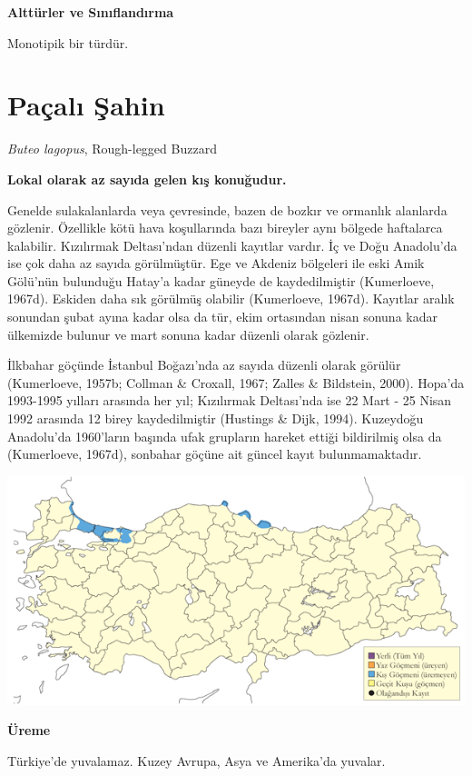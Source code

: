 \documentclass[
  a4paper,
  DIV=11,
  numbers=noendperiod]{scrreprt}
\begin{document}
\textbf{Alttürler ve Sınıflandırma}

Monotipik bir türdür.

\section{Paçalı Şahin}\label{pauxe7alux131-ux15fahin}

\emph{Buteo lagopus}, Rough-legged Buzzard

\textbf{Lokal olarak az sayıda gelen kış konuğudur.}

Genelde sulakalanlarda veya çevresinde, bazen de bozkır ve ormanlık
alanlarda gözlenir. Özellikle kötü hava koşullarında bazı bireyler aynı
bölgede haftalarca kalabilir. Kızılırmak Deltası'ndan düzenli kayıtlar
vardır. İç ve Doğu Anadolu'da ise çok daha az sayıda görülmüştür. Ege ve
Akdeniz bölgeleri ile eski Amik Gölü'nün bulunduğu Hatay'a kadar güneyde
de kaydedilmiştir (Kumerloeve, 1967d). Eskiden daha sık görülmüş
olabilir (Kumerloeve, 1967d). Kayıtlar aralık sonundan şubat ayına kadar
olsa da tür, ekim ortasından nisan sonuna kadar ülkemizde bulunur ve
mart sonuna kadar düzenli olarak gözlenir.

İlkbahar göçünde İstanbul Boğazı'nda az sayıda düzenli olarak görülür
(Kumerloeve, 1957b; Collman \& Croxall, 1967; Zalles \& Bildstein,
2000). Hopa'da 1993-1995 yılları arasında her yıl; Kızılırmak
Deltası'nda ise 22 Mart - 25 Nisan 1992 arasında 12 birey kaydedilmiştir
(Hustings \& Dijk, 1994). Kuzeydoğu Anadolu'da 1960'ların başında ufak
grupların hareket ettiği bildirilmiş olsa da (Kumerloeve, 1967d),
sonbahar göçüne ait güncel kayıt bulunmamaktadır.

\includegraphics{images/harita_Page_109.png}

\textbf{Üreme}

Türkiye'de yuvalamaz. Kuzey Avrupa, Asya ve Amerika'da yuvalar.
\end{document}
